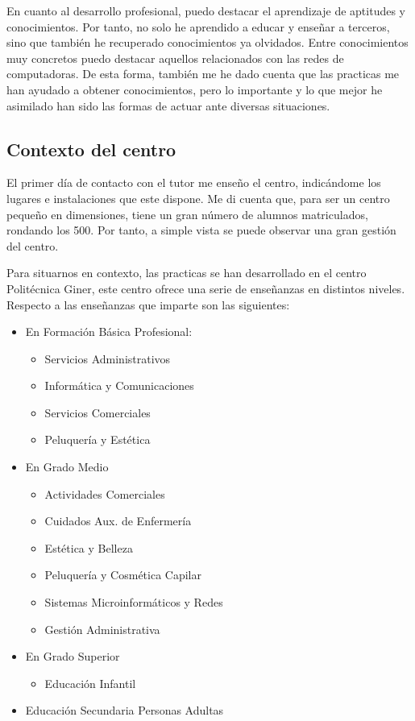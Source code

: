 \documentclass[spanish,12pt, a4paper,twoside]{paper}
\begin{document}
En cuanto al desarrollo profesional, puedo destacar el aprendizaje de aptitudes y conocimientos. Por tanto, no solo he aprendido a educar y enseñar a terceros, sino que también he recuperado conocimientos ya olvidados. Entre conocimientos muy concretos puedo destacar aquellos relacionados con las redes de computadoras. De esta forma, también me he dado cuenta que las practicas me han ayudado a obtener conocimientos, pero lo importante y lo que mejor he asimilado han sido las formas de actuar ante diversas situaciones.

\subsection{Contexto del centro}
El primer día de contacto con el tutor me enseño el centro, indicándome los lugares e instalaciones que este dispone. Me di cuenta que, para ser un centro pequeño en dimensiones, tiene un gran número de alumnos matriculados, rondando los 500. Por tanto, a simple vista se puede observar una gran gestión del centro.

Para situarnos en contexto, las practicas se han desarrollado en el centro Politécnica Giner, este centro ofrece una serie de enseñanzas en distintos niveles.
Respecto a las enseñanzas que imparte son las siguientes:
\begin{itemize}
\item En Formación Básica Profesional:
\begin{itemize}
\item Servicios Administrativos
\item Informática y Comunicaciones
\item Servicios Comerciales
\item Peluquería y Estética
\end{itemize}
\item En Grado Medio
\begin{itemize}
\item Actividades Comerciales
\item Cuidados Aux. de Enfermería
\item Estética y Belleza
\item Peluquería y Cosmética Capilar
\item Sistemas Microinformáticos y Redes
\item Gestión Administrativa
\end{itemize}
\item En Grado Superior
\begin{itemize}
\item Educación Infantil
\end{itemize}
\item Educación Secundaria Personas Adultas
\end{itemize}
\end{document}
